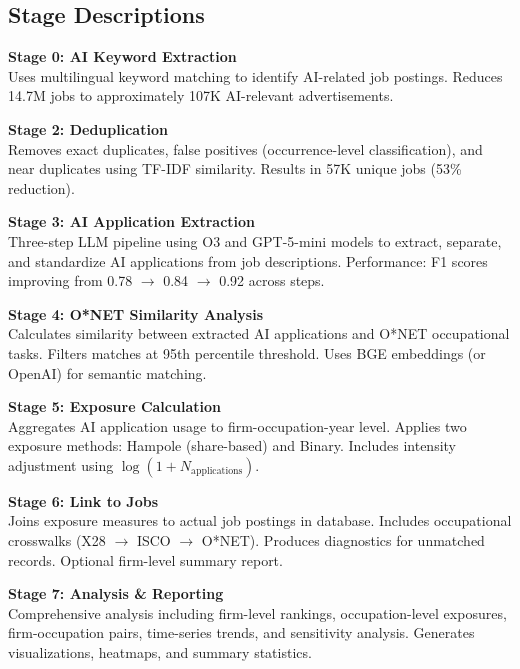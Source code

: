 \documentclass[11pt]{article}
\begin{document}
\subsection*{Stage Descriptions}

\textbf{Stage 0: AI Keyword Extraction} \\
Uses multilingual keyword matching to identify AI-related job postings. Reduces 14.7M jobs to approximately 107K AI-relevant advertisements.

\textbf{Stage 2: Deduplication} \\
Removes exact duplicates, false positives (occurrence-level classification), and near duplicates using TF-IDF similarity. Results in 57K unique jobs (53\% reduction).

\textbf{Stage 3: AI Application Extraction} \\
Three-step LLM pipeline using O3 and GPT-5-mini models to extract, separate, and standardize AI applications from job descriptions. Performance: F1 scores improving from 0.78 $\to$ 0.84 $\to$ 0.92 across steps.

\textbf{Stage 4: O*NET Similarity Analysis} \\
Calculates similarity between extracted AI applications and O*NET occupational tasks. Filters matches at 95th percentile threshold. Uses BGE embeddings (or OpenAI) for semantic matching.

\textbf{Stage 5: Exposure Calculation} \\
Aggregates AI application usage to firm-occupation-year level. Applies two exposure methods: Hampole (share-based) and Binary. Includes intensity adjustment using $\log(1 + N_{\text{applications}})$.

\textbf{Stage 6: Link to Jobs} \\
Joins exposure measures to actual job postings in database. Includes occupational crosswalks (X28 $\to$ ISCO $\to$ O*NET). Produces diagnostics for unmatched records. Optional firm-level summary report.

\textbf{Stage 7: Analysis \& Reporting} \\
Comprehensive analysis including firm-level rankings, occupation-level exposures, firm-occupation pairs, time-series trends, and sensitivity analysis. Generates visualizations, heatmaps, and summary statistics.
\end{document}
